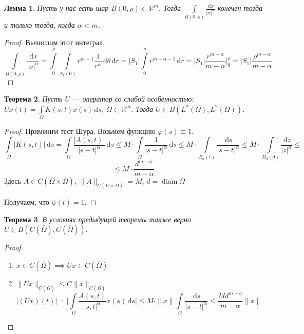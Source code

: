 \documentclass[11pt,openany,a4paper]{scrartcl}
\theoremstyle{plain}
\newtheorem{theorem}{Теорема}[section]
\newtheorem{lemma}[theorem]{Лемма}
\theoremstyle{definition}
\newcommand\mb{\mathbb}
\newcommand\real{\mb R}
\newcommand{\dif}{\, \mathrm d}
\DeclareMathOperator{\diam}{diam}
\begin{document}
\begin{lemma}
    Пусть у нас есть шар $B(0, \rho) \subset \real^m$. Тогда
    $\int\limits_{B(0, \rho)} \frac{\dif x}{|x|^\alpha}$ конечен тогда и только 
    тогда, когда $\alpha < m$.
\end{lemma}
\begin{proof}
    Вычислим этот интеграл.
    $$
    \int\limits_{B(0, \rho)} \frac{\dif x}{|x|^\alpha} =
    \int\limits_0^\rho \int\limits_{S_1(0)}
    r^{m-1}\frac{1}{r^\alpha}\dif \theta \dif r =
    |S_1| \int\limits_0^\rho r^{m - \alpha - 1} \dif r =
    |S_1| \frac{r^{m - \alpha}}{m - \alpha}\bigg|_0^\rho =
    |S_1|\frac{\rho^{m - \alpha}}{m - \alpha}
    $$
\end{proof}
\begin{theorem}
    Пусть $U$ — оператор со слабой особенностью:
    $Ux(t) = \int\limits_\Omega K(s,t) x(s) \dif s$, $\Omega \subset \real^m$.
    Тогда $U\in B(L^2(\Omega), L^2(\Omega))$.
\end{theorem}
\begin{proof}
    Применим тест Шура. Возьмём функцию $\varphi(s) \equiv 1$.
    $$
    \int\limits_\Omega|K(s, t)|\dif s =
    \int\limits_\Omega \frac{|A(s,t)|}{|s-t|^\alpha}\dif s \leqslant
    M\cdot \int\limits_\Omega \frac{1}{|s-t|^\alpha}\dif s \leqslant
    M\cdot \int\limits_{B_d(t)} \frac{\dif s}{|s - t|^\alpha} \leqslant
    M \cdot \int\limits_{B_d(0)} \frac{\dif z}{|z|^\alpha} \leqslant
    $$
    $$
    \leqslant M \cdot \frac{d^{m - \alpha}}{m - \alpha}
    $$
    Здесь $A \in C(\overline\Omega \times \overline\Omega)$,
    $\|A\|_{C(\overline\Omega \times \overline\Omega)} = M$,
    $d = \diam \overline\Omega$
    
    Получаем, что $\psi(t) = 1$.
\end{proof}
\begin{theorem}
    В условиях предыдущей теоремы также верно
    $U \in B(C(\overline\Omega), C(\overline\Omega))$.
\end{theorem}
\begin{proof}
    \begin{enumerate}
        \item $x \in C(\overline\Omega) \implies Ux \in C(\overline\Omega)$
        \item $\|Ux\|_{C(\overline\Omega)} \leqslant C \|x\|_{C(\overline\Omega)}$
        $$
        |(Ux)(t)| = \bigg|\int\limits_\Omega
        \frac{A(s,t)}{|s,t|^\alpha}x(s)\dif s\bigg| \leqslant M\cdot \|x\|
        \int\limits_\Omega \frac{\dif s}{|s - t|^\alpha} \leqslant
        \frac{Md^{m - a}}{m - \alpha}\|x\|.
        $$
    \end{enumerate}
\end{proof}
\end{document}

